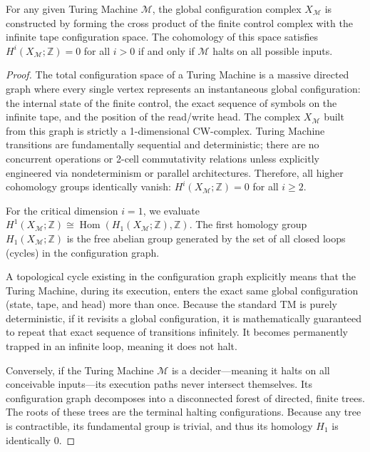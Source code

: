 \begin{theorem}
For any given Turing Machine $\mathcal{M}$, the global configuration complex $X_\mathcal{M}$ is constructed by forming the cross product of the finite control complex with the infinite tape configuration space. The cohomology of this space satisfies $H^i(X_\mathcal{M}; \mathbb{Z}) = 0$ for all $i > 0$ if and only if $\mathcal{M}$ halts on all possible inputs.
\end{theorem}
\begin{proof}
The total configuration space of a Turing Machine is a massive directed graph where every single vertex represents an instantaneous global configuration: the internal state of the finite control, the exact sequence of symbols on the infinite tape, and the position of the read/write head. The complex $X_\mathcal{M}$ built from this graph is strictly a 1-dimensional CW-complex. Turing Machine transitions are fundamentally sequential and deterministic; there are no concurrent operations or 2-cell commutativity relations unless explicitly engineered via nondeterminism or parallel architectures.
Therefore, all higher cohomology groups identically vanish: $H^i(X_\mathcal{M}; \mathbb{Z}) = 0$ for all $i \ge 2$.

For the critical dimension $i=1$, we evaluate $H^1(X_\mathcal{M}; \mathbb{Z}) \cong \operatorname{Hom}(H_1(X_\mathcal{M}; \mathbb{Z}), \mathbb{Z})$. The first homology group $H_1(X_\mathcal{M}; \mathbb{Z})$ is the free abelian group generated by the set of all closed loops (cycles) in the configuration graph.

A topological cycle existing in the configuration graph explicitly means that the Turing Machine, during its execution, enters the exact same global configuration (state, tape, and head) more than once. Because the standard TM is purely deterministic, if it revisits a global configuration, it is mathematically guaranteed to repeat that exact sequence of transitions infinitely. It becomes permanently trapped in an infinite loop, meaning it does not halt.

Conversely, if the Turing Machine $\mathcal{M}$ is a decider—meaning it halts on all conceivable inputs—its execution paths never intersect themselves. Its configuration graph decomposes into a disconnected forest of directed, finite trees. The roots of these trees are the terminal halting configurations. Because any tree is contractible, its fundamental group is trivial, and thus its homology $H_1$ is identically $0$.


\end{proof}
